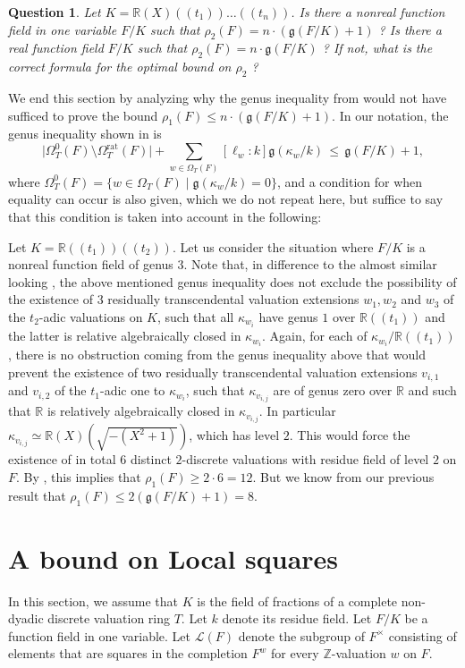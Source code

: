 \documentclass[a4paper,12pt,reqno]{amsart}
\newcommand\zz{\mathbb Z}
\newcommand\mc\mathcal
\newtheorem{qu}[thm]{Question}
\theoremstyle{definition}
\numberwithin{equation}{thm}
\renewcommand{\leq}{\leqslant}
\renewcommand{\geq}{\geqslant}
\begin{document}
\begin{qu} Let $K=\mathbb{R}(X)(\!(t_1)\!)\ldots(\!(t_{n})\!)$. Is there a nonreal function field in one variable $F/K$ such that $\rho_2(F)=n\cdot (\mathfrak{g}(F/K) +1)$ ? 
Is there a real function field $F/K$ such that $\rho_2(F)=n\cdot\mathfrak{g}(F/K)$ ? If not, what is the correct formula for the optimal bound on $\rho_2$ ?
\end{qu}

We end this section by analyzing why the genus inequality from \cite{BG24} would not have sufficed to prove the bound $\rho_1(F) \leq n \cdot (\mathfrak{g}(F/K)+1)$. In our notation, the genus inequality shown in \cite{BG24} is 
$$\vert \Omega^0_{T}(F) \setminus \Omega^{\mathrm{rat}}_T(F) \vert + \sum_{w \in \Omega_T(F)} [\ell_w:k] \mathfrak{g}(\kappa_w/k)  \, \leq \, \mathfrak{g}(F/K) +1,$$
where $\Omega^0_{T}(F)=\{w \in \Omega_{T}(F)\mid \mathfrak{g}(\kappa_w/k)=0\}$, and a condition for when equality can occur is also given, which we do not repeat here, but suffice to say that this condition is taken into account in the following:

\smallskip

Let $K=\mathbb{R}(\!(t_1)\!)(\!(t_{2})\!)$.  Let us consider the situation where $F/K$ is a nonreal function field of genus $3$. Note that, in difference to the almost similar looking , the above mentioned genus inequality does not exclude the possibility of the existence of $3$ residually transcendental valuation extensions $w_1,w_2$ and $w_3$ of the $t_2$-adic valuations on $K$, such that all $\kappa_{w_i}$ have genus $1$ over $\mathbb{R}(\!(t_1)\!)$ and the latter is relative algebraically closed in $\kappa_{w_i}$.    
Again, for each of  $\kappa_{w_i}/\mathbb{R}(\!(t_1)\!)$, there is no obstruction coming from the genus inequality above that would prevent the existence of two residually transcendental valuation extensions $v_{i,1}$ and $v_{i,2}$ of the $t_1$-adic one to $\kappa_{w_i}$, such that $\kappa_{v_{i,j}}$ are of genus zero over $\mathbb{R}$ and such that $\mathbb{R}$ is relatively algebraically closed in $\kappa_{v_{i,j}}$. In particular $\kappa_{v_{i,j}}\simeq \mathbb{R}(X)(\sqrt{-(X^2+1)})$, which has level $2$. This would force the existence of in total $6$ distinct $2$-discrete valuations with residue field of level $2$ on $F$. By \cite[Lemma 4.4]{GM24}, this implies that $\rho_1(F) \geq  2 \cdot 6= 12$. But we know from our previous result that $\rho_1(F) \leq 2 (\mathfrak{g}(F/K)+1)= 8$. 

\section{A bound on Local squares}
In this section, we assume that $K$ is the field of fractions of a complete non-dyadic discrete valuation ring $T$. Let $k$ denote its residue field. 
Let $F/K$ be a function field in one variable.  
Let $\mc{L}(F)$ denote the subgroup of $F^\times$ consisting of elements that are squares in the completion  $F^w$ for every $\zz$-valuation $w$ on $F$.
\end{document}
